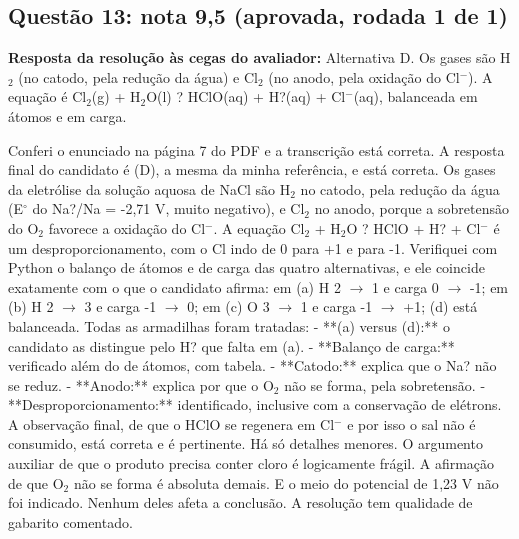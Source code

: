 \documentclass{article}%
\begin{document}
\subsection*{Questão 13: nota 9,5 (aprovada, rodada 1 de 1)}%
\textbf{Resposta da resolução às cegas do avaliador:} Alternativa D. Os gases são H$_{2}$ (no catodo, pela redução da água) e Cl$_{2}$ (no anodo, pela oxidação do Cl$^{-}$). A equação é Cl$_{2}$(g) + H$_{2}$O(l) ? HClO(aq) + H?(aq) + Cl$^{-}$(aq), balanceada em átomos e em carga.\par %
Conferi o enunciado na página 7 do PDF e a transcrição está correta. A resposta final do candidato é (D), a mesma da minha referência, e está correta. Os gases da eletrólise da solução aquosa de NaCl são H$_{2}$ no catodo, pela redução da água (E$^\circ$ do Na?/Na = -2,71 V, muito negativo), e Cl$_{2}$ no anodo, porque a sobretensão do O$_{2}$ favorece a oxidação do Cl$^{-}$. A equação Cl$_{2}$ + H$_{2}$O ? HClO + H? + Cl$^{-}$ é um desproporcionamento, com o Cl indo de 0 para +1 e para -1. Verifiquei com Python o balanço de átomos e de carga das quatro alternativas, e ele coincide exatamente com o que o candidato afirma: em (a) H 2 $\to$ 1 e carga 0 $\to$ -1; em (b) H 2 $\to$ 3 e carga -1 $\to$ 0; em (c) O 3 $\to$ 1 e carga -1 $\to$ +1; (d) está balanceada.\newline%
\newline%
Todas as armadilhas foram tratadas:\newline%
{-} **(a) versus (d):** o candidato as distingue pelo H? que falta em (a).\newline%
{-} **Balanço de carga:** verificado além do de átomos, com tabela.\newline%
{-} **Catodo:** explica que o Na? não se reduz.\newline%
{-} **Anodo:** explica por que o O$_{2}$ não se forma, pela sobretensão.\newline%
{-} **Desproporcionamento:** identificado, inclusive com a conservação de elétrons.\newline%
\newline%
A observação final, de que o HClO se regenera em Cl$^{-}$ e por isso o sal não é consumido, está correta e é pertinente.\newline%
\newline%
Há só detalhes menores. O argumento auxiliar de que o produto precisa conter cloro é logicamente frágil. A afirmação de que O$_{2}$ não se forma é absoluta demais. E o meio do potencial de 1,23 V não foi indicado. Nenhum deles afeta a conclusão. A resolução tem qualidade de gabarito comentado.%
\end{document}
